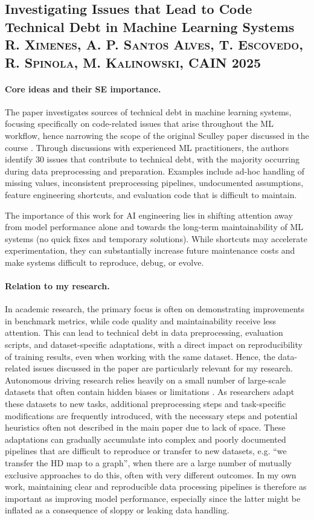 \documentclass[11pt]{article}
\begin{document}
\subsection{Investigating Issues that Lead to Code Technical Debt in Machine Learning Systems\\\small \textsc{R. Ximenes, A. P. Santos Alves, T. Escovedo, R. Spinola, M. Kalinowski}, CAIN 2025}
\paragraph{Core ideas and their SE importance.}
The paper investigates sources of technical debt in machine learning systems, focusing specifically on code-related issues that arise throughout the ML workflow, hence narrowing the scope of the original Sculley paper discussed in the course \cite{sculley}. Through discussions with experienced ML practitioners, the authors identify 30 issues that contribute to technical debt, with the majority occurring during data preprocessing and preparation. Examples include ad-hoc handling of missing values, inconsistent preprocessing pipelines, undocumented assumptions, feature engineering shortcuts, and evaluation code that is difficult to maintain.

The importance of this work for AI engineering lies in shifting attention away from model performance alone and towards the long-term maintainability of ML systems (no quick fixes and temporary solutions). While shortcuts may accelerate experimentation, they can substantially increase future maintenance costs and make systems difficult to reproduce, debug, or evolve. 

\paragraph{Relation to my research.} In academic research, the primary focus is often on demonstrating improvements in benchmark metrics, while code quality and maintainability receive less attention. This can lead to technical debt in data preprocessing, evaluation scripts, and dataset-specific adaptations, with a direct impact on reproducibility of training results, even when working with the same dataset. Hence, the data-related issues discussed in the paper are particularly relevant for my research. Autonomous driving research relies heavily on a small number of large-scale datasets that often contain hidden biases or limitations \cite{argoverse2, nuscenes}. As researchers adapt these datasets to new tasks, additional preprocessing steps and task-specific modifications are frequently introduced, with the necessary steps and potential heuristics often not described in the main paper due to lack of space. These adaptations can gradually accumulate into complex and poorly documented pipelines that are difficult to reproduce or transfer to new datasets, e.g. ``we transfer the HD map to a graph'', when there are a large number of mutually exclusive approaches to do this, often with very different outcomes. In my own work, maintaining clear and reproducible data processing pipelines is therefore as important as improving model performance, especially since the latter might be inflated as a consequence of sloppy or leaking data handling.
\end{document}
